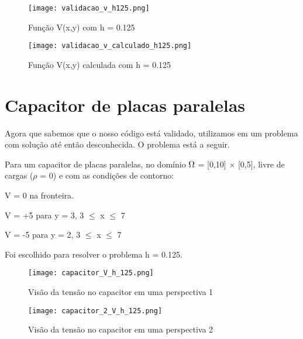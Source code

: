 \documentclass[
12pt,				%
oneside,			%
a4paper,			%
english,			%
french,				%
spanish,			%
brazil				%
]{abntex2}
\begin{document}
\begin{figure}[H]
	\begin{center}
		\texttt{[image: validacao\_v\_h125.png]}
		\caption{Função V(x,y) com h = 0.125}
		\label{fluxograma}
	\end{center}
\end{figure}

\begin{figure}[H]
	\begin{center}
		\texttt{[image: validacao\_v\_calculado\_h125.png]}
		\caption{Função V(x,y) calculada com h = 0.125}
		\label{fluxograma}
	\end{center}
\end{figure}





\chapter{Capacitor de placas paralelas}

Agora que sabemos que o nosso código está validado, utilizamos em um problema com solução até então desconhecida. O problema está a seguir.

Para um capacitor de placas paralelas, no domínio $\ohm$  = [0,10] $\times$ [0,5], livre de cargas ($\rho$ = 0) e com as condições de contorno:

\begin{center}
V = 0 na fronteira. 

V = +5 para  y = 3,  3 $\leq $ x $\leq $  7

V = -5 para  y = 2,  3 $\leq $ x $\leq $  7
\end{center} 

Foi escolhido para resolver o problema h = 0.125.

\begin{figure}[H]
	\begin{center}
		\texttt{[image: capacitor\_V\_h\_125.png]}
		\caption{Visão da tensão no capacitor em uma perspectiva 1}
		\label{fluxograma}
	\end{center}
\end{figure}

\begin{figure}[H]
	\begin{center}
		\texttt{[image: capacitor\_2\_V\_h\_125.png]}
		\caption{Visão da tensão no capacitor em uma perspectiva 2}
		\label{fluxograma}
	\end{center}
\end{figure}
\end{document}

